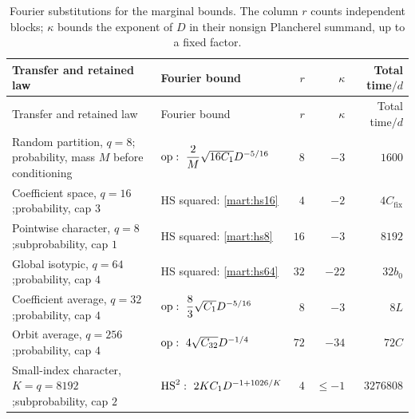 \begingroup
\small
\setlength{\tabcolsep}{4pt}
\renewcommand{\arraystretch}{1.2}
\begin{longtable}{@{}p{.31\linewidth}p{.30\linewidth}r r r@{}}
\caption{Fourier substitutions for the marginal bounds. The column $r$
counts independent blocks; $\kappa$ bounds the exponent of $D$ in
their nonsign Plancherel summand, up to a fixed factor.}
\label{mart:transfer-table}\\
\toprule
Transfer and retained law & Fourier bound & $r$ & $\kappa$ & Total time$/d$\\
\midrule
\endfirsthead
\toprule
Transfer and retained law & Fourier bound & $r$ & $\kappa$ & Total time$/d$\\
\midrule
\endhead
\bottomrule
\endfoot
Random partition, $q=8$;\newline
probability, mass $M$ before conditioning
&
$\op:\ \dfrac2M\sqrt{16C_1}D^{-5/16}$
& $8$ & $-3$ & $1600$\\
Coefficient space, $q=16$;\newline probability, cap $3$
&
HS squared: \eqref{mart:hs16}
& $4$ & $-2$ & $4C_{\mathrm{fix}}$\\
Pointwise character, $q=8$;\newline subprobability, cap $1$
&
HS squared: \eqref{mart:hs8}
& $16$ & $-3$ & $8192$\\
Global isotypic, $q=64$;\newline probability, cap $4$
&
HS squared: \eqref{mart:hs64}
& $32$ & $-22$ & $32b_0$\\
Coefficient average, $q=32$;\newline probability, cap $4$
&
$\op:\ \dfrac83\sqrt{C_1}D^{-5/16}$
& $8$ & $-3$ & $8L$\\
Orbit average, $q=256$;\newline probability, cap $4$
&
$\op:\ 4\sqrt{C_{32}}D^{-1/4}$
& $72$ & $-34$ & $72C$\\
Small-index character,\newline $K=q=8192$;\newline subprobability, cap $2$
&
$\HS^2:\ 2KC_1D^{-1+1026/K}$
& $4$ & $\le-1$ & $3276808$\\
\end{longtable}
\endgroup

